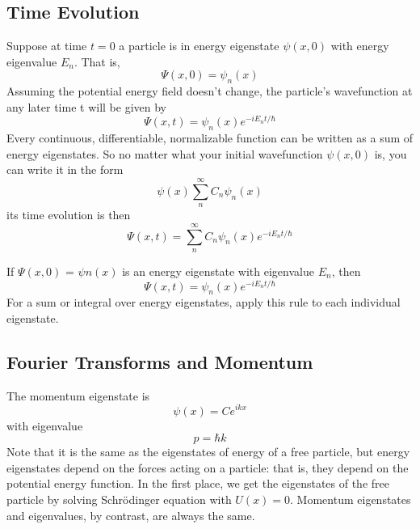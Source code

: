 \documentclass[../../main.tex]{subfiles}
\begin{document}
\subsection{Time Evolution}
Suppose at time $t = 0$ a particle is in energy eigenstate $\psi (x,0)$ with energy eigenvalue $E_n$.
That is,
\begin{equation*}
    \Psi (x,0)=\psi_n(x)
\end{equation*}
Assuming the potential energy field doesn't change, the particle's wavefunction at any later
time t will be given by
\begin{equation*}
    \Psi(x,t)=\psi_n (x)e^{-iE_n t/\hbar}
\end{equation*}
Every continuous, differentiable, normalizable function can be written as a sum of energy eigenstates. So no matter what your initial wavefunction $\psi (x,0)$ is, you can write it in the
form 
\begin{equation*}
    \psi (x)\sum_{n}^{\infty}C_n \psi_n(x)
\end{equation*}
its time evolution is then 
\begin{equation*}
    \Psi(x,t)=\sum_{n}^{\infty}C_n\psi_n (x)e^{-iE_n t/\hbar}
\end{equation*}

If $\Psi (x,0)$ = $\psi n(x)$ is an energy eigenstate with eigenvalue $E_n$, then
\begin{equation*}
    \Psi(x,t)=\psi_n (x)e^{-iE_n t/\hbar}
\end{equation*}
For a sum or integral over energy eigenstates, apply this rule to each individual eigenstate.

\subsection{Fourier Transforms and Momentum}
The momentum eigenstate is 
\begin{equation*}
    \psi(x) = Ce^{ikx}
\end{equation*}
with eigenvalue
\begin{equation*}
    p = \hbar k
\end{equation*}
Note that it is the same as the eigenstates of energy of a free particle, but energy eigenstates depend on the forces acting on a particle: that is, they depend on the potential energy function. In the first place, we get the eigenstates of the free particle by solving Schrödinger equation with $U(x) = 0 $. Momentum eigenstates and eigenvalues, by contrast, are always the same.
\end{document}
